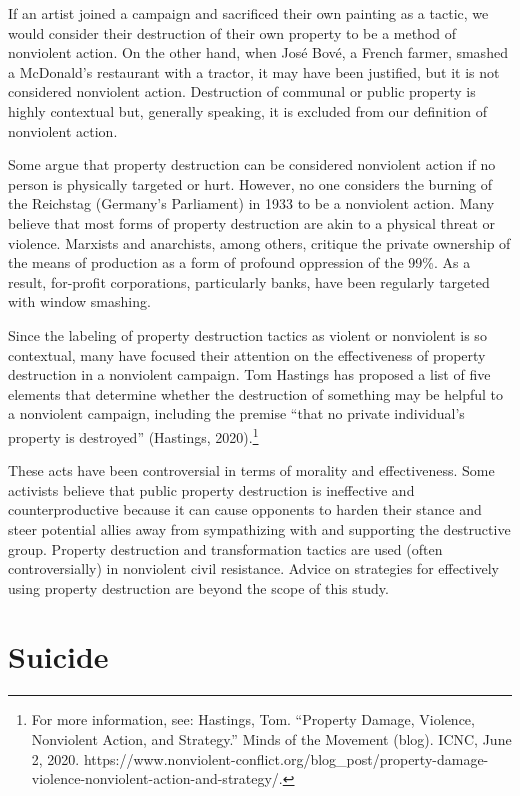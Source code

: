 \documentclass[twoside,a4paper,12pt,fleqn,openany]{extbook}
\begin{document}
If an artist joined a campaign and sacrificed their own painting as a tactic, we would consider their destruction of their own property to be a method of nonviolent action. On the other hand, when José Bové, a French farmer, smashed a McDonald’s restaurant with a tractor, it may have been justified, but it is not considered nonviolent action. Destruction of communal or public property is highly contextual but, generally speaking, it is excluded from our definition of nonviolent action.

Some argue that property destruction can be considered nonviolent action if no person is physically targeted or hurt. However, no one considers the burning of the Reichstag (Germany’s Parliament) in 1933 to be a nonviolent action. Many believe that most forms of property destruction are akin to a physical threat or violence. Marxists and anarchists, among others, critique the private ownership of the means of production as a form of profound oppression of the 99\%. As a result, for-profit corporations, particularly banks, have been regularly targeted with window smashing.

Since the labeling of property destruction tactics as violent or nonviolent is so contextual, many have focused their attention on the effectiveness of property destruction in a nonviolent campaign. Tom Hastings has proposed a list of five elements that determine whether the destruction of something may be helpful to a nonviolent campaign, including the premise “that no private individual’s property is destroyed” (Hastings, 2020).\footnote{For more information, see: Hastings, Tom. “Property Damage, Violence, Nonviolent Action, and Strategy.” Minds of the Movement (blog). ICNC, June 2, 2020. https://www.nonviolent-conflict.org/blog_post/property-damage-violence-nonviolent-action-and-strategy/.}

These acts have been controversial in terms of morality and effectiveness. Some activists believe that public property destruction is ineffective and counterproductive because it can cause opponents to harden their stance and steer potential allies away from sympathizing with and supporting the destructive group. Property destruction and transformation tactics are used (often controversially) in nonviolent civil resistance. Advice on strategies for effectively using property destruction are beyond the scope of this study.

\section*{Suicide}
\end{document}

